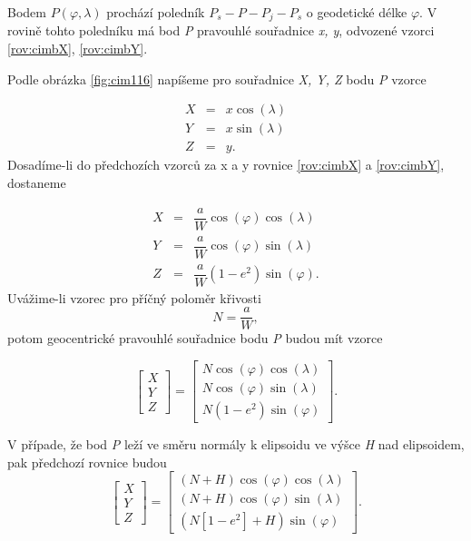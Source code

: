 Bodem $P\left(\varphi, \lambda\right)$ prochází poledník $P_{s}-P-P_{j}-P_{s}$ o geodetické délke $\varphi$. V rovině tohto poledníku má bod \textit{P} pravouhlé souřadnice \textit{x, y}, odvozené vzorci \ref{rov:cimbX}, \ref{rov:cimbY}.

Podle obrázka \ref{fig:cim116} napíšeme pro souřadnice \textit{X, Y, Z} bodu \textit{P} vzorce

\begin{eqnarray}
X &=& x\cos{\left(\lambda\right)} \\
Y &=& x\sin{\left(\lambda\right)} \\
Z &=& y. 
\end{eqnarray}
Dosadíme-li do předchozích vzorců za x a y rovnice \ref{rov:cimbX} a \ref{rov:cimbY}, dostaneme

\begin{eqnarray}
X &=& \dfrac{a}{W}\cos{\left(\varphi\right)}\cos{\left(\lambda\right)} \\
Y &=& \dfrac{a}{W}\cos{\left(\varphi\right)}\sin{\left(\lambda\right)} \\
Z &=& \dfrac{a}{W}\left(1-e^{2}\right)\sin{\left(\varphi\right)}.
\end{eqnarray}
Uvážime-li vzorec pro příčný poloměr křivosti 
\begin{equation}
N = \dfrac{a}{W},
\end{equation}
potom geocentrické pravouhlé souřadnice bodu \textit{P} budou mít vzorce

\begin{equation}
\begin{bmatrix}
X\\
Y\\
Z
\end{bmatrix} = 
\begin{bmatrix}
N\cos{\left(\varphi\right)}\cos{\left(\lambda\right)}\\
N\cos{\left(\varphi\right)}\sin{\left(\lambda\right)}\\
N\left(1-e^{2}\right)\sin{\left(\varphi\right)}
\end{bmatrix}.
\end{equation}

V případe, že bod \textit{P} leží ve směru normály k elipsoidu ve výšce \textit{H} nad elipsoidem, pak předchozí rovnice budou
\begin{equation}
\begin{bmatrix}
X\\
Y\\
Z
\end{bmatrix} = 
\begin{bmatrix}
\left(N+H\right)\cos{\left(\varphi\right)}\cos{\left(\lambda\right)}\\
\left(N+H\right)\cos{\left(\varphi\right)}\sin{\left(\lambda\right)}\\
\left(N\left[1-e^{2}\right]+H\right)\sin{\left(\varphi\right)}
\end{bmatrix}.
\label{rov:geodEcef}
\end{equation}


